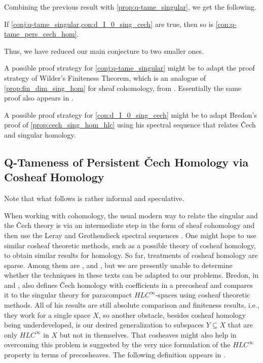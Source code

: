 Combining the previous result with \cref{prop:q-tame_singular}, we get the following.

\begin{cor}
If \cref{conj:q-tame_singular,con:d_I_0_sing_cech} are true, then so is \cref{con:q-tame_pers_cech_hom}.
\end{cor}

Thus, we have reduced our main conjecture to two smaller ones.

A possible proof strategy for \cref{conj:q-tame_singular} might be to adapt the proof strategy of Wilder's Finiteness Theorem, which is an analogue of \cref{prop:fin_dim_sing_hom} for sheaf cohomology, from \cite[Section II.17]{MR1481706}. Essentially the same proof also appears in \cite[Section III.10]{MR842190}.

A possible proof strategy for \cref{con:d_I_0_sing_cech} might be to adapt Bredon's proof of \cref{prop:cech_sing_hom_hlc} using his spectral sequence that relates \v{C}ech and singular homology.

\subsection{Q-Tameness of Persistent \v{C}ech Homology via Cosheaf Homology}\label{sec:cosheaf}
Note that what follows is rather informal and speculative.

When working with cohomology, the usual modern way to relate the singular and the \v{C}ech theory is via an intermediate step in the form of sheaf cohomology and then use the Leray and Grothendieck spectral sequences \cite[Chapter III]{MR1481706}. One might hope to use similar cosheaf theoretic methods, such as a possible theory of cosheaf homology, to obtain similar results for homology. So far, treatments of cosheaf homology are sparse. Among them are \cite{Andreotti.1973}, \cite{Schneiders.1987} and \cite{prasolov2018cosheaves}, but we are presently unable to determine whether the techniques in these texts can be adapted to our problems. Bredon, in \cite{Bredon.1968} and \cite[Chapter VI]{MR1481706}, also defines \v{C}ech homology with coefficients in a precosheaf and compares it to the singular theory for paracompact $HLC^{\infty}$-spaces \cite[Section VI.4 and Theorem VI.12.6]{MR1481706} using cosheaf theoretic methods. All of his results are still absolute comparison and finiteness results, i.e., they work for a single space $X$, so another obstacle, besides cosheaf homology being underdeveloped, is our desired generalization to subspaces $Y\subseteq X$ that are only $HLC^{\infty}$ in $X$ but not in themselves. That cosheaves might also help in overcoming this problem is suggested by the very nice formulation of the $HLC^{\infty}$ property in terms of precosheaves. The following definition appears in \cite{MR1481706}.

